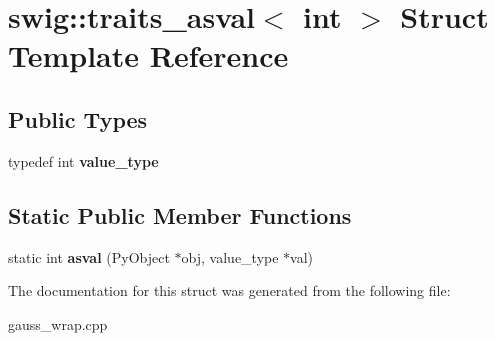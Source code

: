 \hypertarget{structswig_1_1traits__asval_3_01int_01_4}{\section{swig\-:\-:traits\-\_\-asval$<$ int $>$ Struct Template Reference}
\label{structswig_1_1traits__asval_3_01int_01_4}
}
\subsection*{Public Types}
\begin{DoxyCompactItemize}
\item 
\hypertarget{structswig_1_1traits__asval_3_01int_01_4_a8afb2f95076742475dd5c1dc176f36b6}{typedef int {\bfseries value\-\_\-type}}\label{structswig_1_1traits__asval_3_01int_01_4_a8afb2f95076742475dd5c1dc176f36b6}

\end{DoxyCompactItemize}
\subsection*{Static Public Member Functions}
\begin{DoxyCompactItemize}
\item 
\hypertarget{structswig_1_1traits__asval_3_01int_01_4_a5068cc0919535d5675bea4d703e8ec2b}{static int {\bfseries asval} (Py\-Object $\ast$obj, value\-\_\-type $\ast$val)}\label{structswig_1_1traits__asval_3_01int_01_4_a5068cc0919535d5675bea4d703e8ec2b}

\end{DoxyCompactItemize}


The documentation for this struct was generated from the following file\-:\begin{DoxyCompactItemize}
\item 
gauss\-\_\-wrap.\-cpp\end{DoxyCompactItemize}
